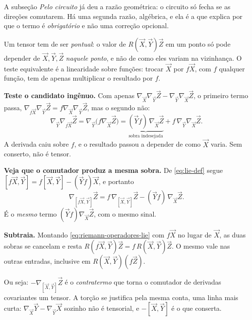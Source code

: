 \documentclass[12pt,a4paper,oneside]{book}
\theoremstyle{rgplain}
\theoremstyle{rgremark}
\begin{document}
A subseção \emph{Pelo circuito} já deu a razão geométrica: o circuito só fecha
se as direções comutarem. Há uma segunda razão, algébrica, e ela é a que
explica por que o termo é \emph{obrigatório} e não uma correção opcional.

Um tensor tem de ser \emph{pontual}: o valor de $R(\vec X,\vec Y)\vec Z$ em um
ponto só pode depender de $\vec X,\vec Y,\vec Z$ \emph{naquele ponto}, e não de
como eles variam na vizinhança. O teste equivalente é a linearidade sobre
funções: trocar $\vec X$ por $f\vec X$, com $f$ qualquer função, tem de apenas
multiplicar o resultado por $f$.

\begin{infografico}
\begin{etapas}
  \item \textbf{Teste o candidato ingênuo.} Com apenas
  $\nabla_{\vec X}\nabla_{\vec Y}\vec Z-\nabla_{\vec Y}\nabla_{\vec X}\vec Z$,
  o primeiro termo passa,
  $\nabla_{f\vec X}\nabla_{\vec Y}\vec Z=f\nabla_{\vec X}\nabla_{\vec Y}\vec Z$,
  mas o segundo não:
  \[
    \nabla_{\vec Y}\nabla_{f\vec X}\vec Z
    =\nabla_{\vec Y}\bigl(f\nabla_{\vec X}\vec Z\bigr)
    =\underbrace{(\vec Yf)\,\nabla_{\vec X}\vec Z}_{\text{sobra indesejada}}
     +f\,\nabla_{\vec Y}\nabla_{\vec X}\vec Z .
  \]
  A derivada caiu sobre $f$, e o resultado passou a depender de como $\vec X$
  varia. Sem conserto, não é tensor.

  \item \textbf{Veja que o comutador produz a mesma sobra.} De
  \eqref{eq:lie-def} segue $[f\vec X,\vec Y]=f[\vec X,\vec Y]-(\vec Yf)\vec X$,
  e portanto
  \[
    \nabla_{[f\vec X,\vec Y]}\vec Z
    =f\,\nabla_{[\vec X,\vec Y]}\vec Z-(\vec Yf)\,\nabla_{\vec X}\vec Z .
  \]
  É o \emph{mesmo} termo $(\vec Yf)\nabla_{\vec X}\vec Z$, com o mesmo sinal.

  \item \textbf{Subtraia.} Montando \eqref{eq:riemann-operadores-lie} com
  $f\vec X$ no lugar de $\vec X$, as duas sobras se cancelam e resta
  $R(f\vec X,\vec Y)\vec Z=f\,R(\vec X,\vec Y)\vec Z$. O mesmo vale nas outras
  entradas, inclusive em $R(\vec X,\vec Y)(f\vec Z)$.
\end{etapas}
\end{infografico}

Ou seja: $-\nabla_{[\vec X,\vec Y]}\vec Z$ é o \emph{contratermo} que torna o
comutador de derivadas covariantes um tensor. A torção se justifica pela mesma
conta, uma linha mais curta: $\nabla_{\vec X}\vec Y-\nabla_{\vec Y}\vec X$
sozinho não é tensorial, e $-[\vec X,\vec Y]$ é o que conserta.
\end{document}

